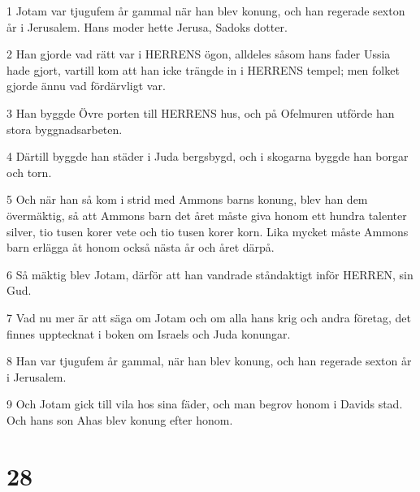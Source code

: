 \par 1 Jotam var tjugufem år gammal när han blev konung, och han regerade sexton år i Jerusalem. Hans moder hette Jerusa, Sadoks dotter.
\par 2 Han gjorde vad rätt var i HERRENS ögon, alldeles såsom hans fader Ussia hade gjort, vartill kom att han icke trängde in i HERRENS tempel; men folket gjorde ännu vad fördärvligt var.
\par 3 Han byggde Övre porten till HERRENS hus, och på Ofelmuren utförde han stora byggnadsarbeten.
\par 4 Därtill byggde han städer i Juda bergsbygd, och i skogarna byggde han borgar och torn.
\par 5 Och när han så kom i strid med Ammons barns konung, blev han dem övermäktig, så att Ammons barn det året måste giva honom ett hundra talenter silver, tio tusen korer vete och tio tusen korer korn. Lika mycket måste Ammons barn erlägga åt honom också nästa år och året därpå.
\par 6 Så mäktig blev Jotam, därför att han vandrade ståndaktigt inför HERREN, sin Gud.
\par 7 Vad nu mer är att säga om Jotam och om alla hans krig och andra företag, det finnes upptecknat i boken om Israels och Juda konungar.
\par 8 Han var tjugufem år gammal, när han blev konung, och han regerade sexton år i Jerusalem.
\par 9 Och Jotam gick till vila hos sina fäder, och man begrov honom i Davids stad. Och hans son Ahas blev konung efter honom.

\chapter{28}

